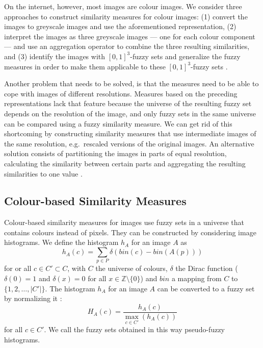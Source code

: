 \documentclass[twocolumn]{phdsymp} %
\begin{document}
On the internet, however, most images are colour images. We consider three approaches to 
construct similarity measures for colour images: (1) convert the images to greyscale 
images and use the aforementioned representation, (2) interpret the images as three 
greyscale images --- one for each colour component --- and use an aggregation
operator \cite{detyniecki:numerical_aggregation_operators} to combine the three resulting
similarities, and (3) identify the 
images with $[0,1]^3$-fuzzy sets  and generalize the fuzzy measures in order to make them 
applicable to these $[0,1]^3$-fuzzy sets
\cite{vanderweken:construction_of_quality_measures}. 

Another problem that needs to be solved, is that the measures need to be able to cope with
images of different resolutions. Measures based on the preceding representations lack that 
feature because the universe of the resulting fuzzy set depends on the resolution of the
image, and only fuzzy sets in the same universe can be compared using a fuzzy similarity 
measure. We can get rid of this shortcoming by constructing similarity measures that
use intermediate images of the same resolution, e.g.~rescaled versions of the 
original images. An alternative solution consists of partitioning the images in parts
of equal resolution, calculating the similarity between certain parts and aggregating
the resulting similarities to one value \cite{detyniecki:numerical_aggregation_operators}.

\subsection{Colour-based Similarity Measures}

Colour-based similarity measures for images use fuzzy sets in a universe that contains colours 
instead of pixels. They can be constructed by considering image histograms. We define
the histogram $h_A$ for an image $A$ as 
\begin{displaymath}
h_A(c) = \sum_{p \in P} \delta (bin(c) - bin(A(p))) 
\end{displaymath} 
for or all $c \in C' \subset C$, with $C$ the universe of colours, $\delta$ the Dirac function ($\delta (0)=1$ and $\delta (x)=0$ for all 
$x \in {\mathbb{Z}} \setminus \{0\}$) and $bin$ a mapping from $C$ to $\{1,2,\ldots,|C'|\}$.
The histogram $h_A$ for an image $A$ can be converted to a fuzzy set by normalizing it 
\cite{vanderweken:similariteitsmaten,vanderweken:construction_of_quality_measures,vertan:fuzzy_histograms}:
\begin{displaymath}
H_A(c) = \frac{\displaystyle h_A(c)}{\displaystyle \max_{c \in C'}(h_A(c))}
\end{displaymath}
for all $c \in C'$. We call the fuzzy sets obtained in this way 
pseudo-fuzzy histograms.
\end{document}
